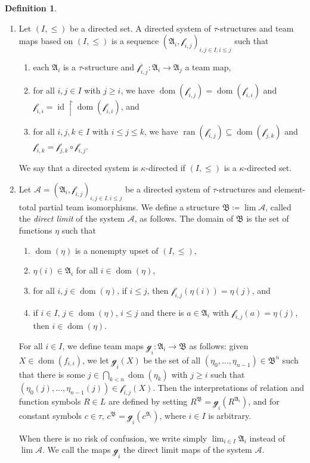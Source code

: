 \documentclass[a4paper]{amsart}
\theoremstyle{definition}
\newtheorem{definition}{Definition}[section]
\theoremstyle{remark}
\renewcommand{\restriction}{ {\upharpoonright} }
\newcommand{\A}{\mathcal{A}}
\newcommand{\B}{\mathcal{B}}
\DeclareMathOperator{\dom}{dom}
\DeclareMathOperator{\ran}{ran}
\theoremstyle{definition}
\renewcommand{\A}{\mathfrak{A}}
\renewcommand{\B}{\mathfrak{B}}
\DeclareMathOperator{\id}{id}
\newcommand{\f}{\mathcal{f}}
\newcommand{\g}{\mathcal{g}}
\begin{document}
\begin{definition}\label{colimit}\quad
    \begin{enumerate}
        \item Let $(I,\leq)$ be a directed set. A directed system of $\tau$-structures and team maps based on $(I,\leq)$ is a sequence $(\A_i,\f_{i,j})_{i,j\in I, i\leq j}$ such that
        \begin{enumerate}
            \item each $\A_i$ is a $\tau$-structure and $\f_{i,j}\colon\A_i\to\A_j$ a team map,
            \item for all $i,j\in I$ with $j\geq i$, we have $\dom(\f_{i,j}) = \dom(\f_{i,i})$ and $\f_{i,i} = \id\restriction\dom(\f_{i,i})$, and
            \item for all $i,j,k\in I$ with $i\leq j\leq k$, we have $\ran(\f_{i,j})\subseteq\dom(\f_{j,k})$ and $\f_{i,k} = \f_{j,k}\circ\f_{i,j}$.
        \end{enumerate}
        We say that a directed system is $\kappa$-directed if $(I,\leq)$ is a $\kappa$-directed set.
        \item Let $\mathcal A = (\A_i,\f_{i,j})_{i,j\in I, i\leq j}$ be a directed system of $\tau$-structures and element-total partial team isomorphisms. We define a structure $\B\coloneqq\lim\mathcal A$, called the \emph{direct limit} of the system $\mathcal A$, as follows. The domain of $\B$ is the set of functions $\eta$ such that
        \begin{enumerate}
            \item $\dom(\eta)$ is a nonempty upset of $(I,\leq)$,
            \item $\eta(i)\in\A_i$ for all $i\in\dom(\eta)$,
            \item for all $i,j\in\dom(\eta)$, if $i\leq j$, then $\f_{i,j}(\eta(i)) = \eta(j)$, and
            \item if $i\in I$, $j\in\dom(\eta)$, $i\leq j$ and there is $a\in\A_i$ with $\f_{i,j}(a) = \eta(j)$, then $i\in\dom(\eta)$.
        \end{enumerate}
        For all $i\in I$, we define team maps $\g_i\colon\A_i\to\B$ as follows: given $X\in\dom(f_{i,i})$, we let $\g_i(X)$ be the set of all $(\eta_0,\dots,\eta_{n-1})\in\B^n$ such that there is some $j\in\bigcap_{k<n}\dom(\eta_k)$ with $j\geq i$ such that $(\eta_0(j),\dots,\eta_{n-1}(j))\in\f_{i,j}(X)$. Then the interpretations of relation and function symbols $R\in L$ are defined by setting $R^\B = \g_i(R^{\A_i})$, and for constant symbols $c\in\tau$, $c^\B = \g_i(c^{\A_i})$, where $i\in I$ is arbitrary.

        When there is no risk of confusion, we write simply $\lim_{i\in I}\A_i$ instead of $\lim\mathcal A$. We call the maps $\g_i$ the direct limit maps of the system $\mathcal A$.
    \end{enumerate}
\end{definition}
\end{document}
